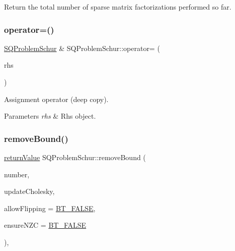 Return the total number of sparse matrix factorizations performed so far. \mbox{\label{class_s_q_problem_schur_a241c620b1197e6e0a08a24a8d25c5cdb}} 
\subsubsection{\texorpdfstring{operator=()}{operator=()}}
{\footnotesize\ttfamily \hyperlink{class_s_q_problem_schur}{S\+Q\+Problem\+Schur} \& S\+Q\+Problem\+Schur\+::operator= (\begin{DoxyParamCaption}\item[{const \hyperlink{class_s_q_problem_schur}{S\+Q\+Problem\+Schur} \&}]{rhs }\end{DoxyParamCaption})\hspace{0.3cm}{\ttfamily [virtual]}}

Assignment operator (deep copy). 
\begin{DoxyParams}{Parameters}
{\em rhs} & Rhs object. \\
\hline
\end{DoxyParams}
\mbox{\label{class_s_q_problem_schur_a0e7968b4acb726701750ffd862ffb7be}} 
\subsubsection{\texorpdfstring{remove\+Bound()}{removeBound()}}
{\footnotesize\ttfamily \hyperlink{_message_handling_8hpp_a81d556f613bfbabd0b1f9488c0fa865e}{return\+Value} S\+Q\+Problem\+Schur\+::remove\+Bound (\begin{DoxyParamCaption}\item[{\hyperlink{_types_8hpp_ab6fd6105e64ed14a0c9281326f05e623}{int\+\_\+t}}]{number,  }\item[{\hyperlink{_types_8hpp_a20f82124c82b6f5686a7fce454ef9089}{Boolean\+Type}}]{update\+Cholesky,  }\item[{\hyperlink{_types_8hpp_a20f82124c82b6f5686a7fce454ef9089}{Boolean\+Type}}]{allow\+Flipping = {\ttfamily \hyperlink{_types_8hpp_a20f82124c82b6f5686a7fce454ef9089a85b8a20e72a8bea5dd10a6007fe3071e}{B\+T\+\_\+\+F\+A\+L\+SE}},  }\item[{\hyperlink{_types_8hpp_a20f82124c82b6f5686a7fce454ef9089}{Boolean\+Type}}]{ensure\+N\+ZC = {\ttfamily \hyperlink{_types_8hpp_a20f82124c82b6f5686a7fce454ef9089a85b8a20e72a8bea5dd10a6007fe3071e}{B\+T\+\_\+\+F\+A\+L\+SE}} }\end{DoxyParamCaption})\hspace{0.3cm}{\ttfamily [protected]}, {\ttfamily [virtual]}}

